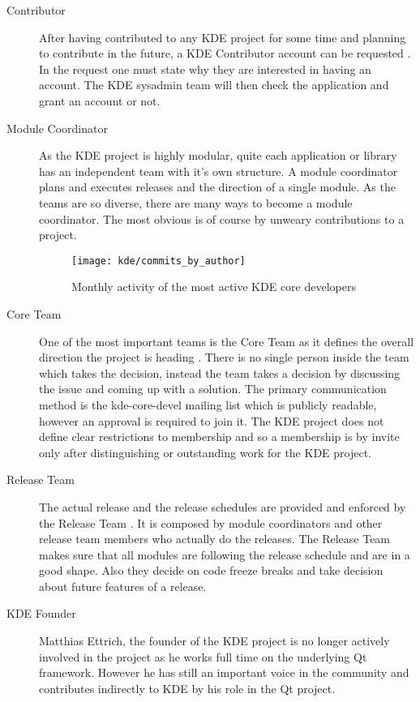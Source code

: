 \begin{description}

  \item[Contributor] After having contributed to any KDE project for some time
    and planning to contribute in the future, a KDE Contributor account can be
    requested \cite{KDEContribute,KDEContributor}. In the request one must
    state why they are interested in having an account. The KDE sysadmin team
    will then check the application and grant an account or not.

  \item[Module Coordinator] As the KDE project is highly modular, quite each
    application or library has an independent team with it's own structure. A
    module coordinator plans and executes releases and the direction of a
    single module. As the teams are so diverse, there are many ways to become a
    module coordinator. The most obvious is of course by unweary contributions
    to a project.

\begin{figure}[htbp]
  \centering
  \texttt{[image: kde/commits\_by\_author]}
  \caption{Monthly activity of the most active KDE core developers}
\end{figure}

  \item[Core Team] One of the most important teams is the Core Team as it
    defines the overall direction the project is heading
    \cite{KDEProjectManagement}. There is no single person inside the team
    which takes the decision, instead the team takes a decision by discussing
    the issue and coming up with a solution. The primary communication method
    is the kde-core-devel mailing list which is publicly readable, however an
    approval is required to join it. The KDE project does not define clear
    restrictions to membership and so a membership is by invite only after
    distinguishing or outstanding work for the KDE project.

  \item[Release Team] The actual release and the release schedules are provided
    and enforced by the Release Team \cite{KDEReleaseTeam}. It is composed by
    module coordinators and other release team members who actually do the
    releases. The Release Team makes sure that all modules are following the
    release schedule and are in a good shape. Also they decide on code freeze
    breaks and take decision about future features of a release.

  \item[KDE Founder] Matthias Ettrich, the founder of the KDE project is no
    longer actively involved in the project as he works full time on the
    underlying Qt framework. However he has still an important voice in the
    community and contributes indirectly to KDE by his role in the Qt project.

\end{description}


